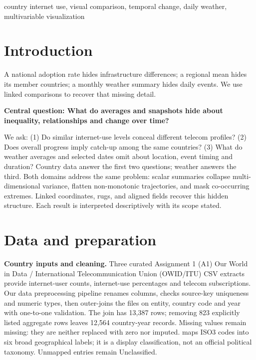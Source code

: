 \documentclass[conference,a4paper]{IEEEtran}
\begin{document}
\begin{IEEEkeywords}country internet use, visual comparison, temporal change, daily weather, multivariable visualization\end{IEEEkeywords}

\section{Introduction}

A national adoption rate hides infrastructure differences; a regional mean hides its member countries; a monthly weather summary hides daily events. We use linked comparisons to recover that missing detail.

\textbf{Central question: What do averages and snapshots hide about inequality, relationships and change over time?}

We ask: (1) Do similar internet-use levels conceal different telecom profiles? (2) Does overall progress imply catch-up among the same countries? (3) What do weather averages and selected dates omit about location, event timing and duration? Country data answer the first two questions; weather answers the third. Both domains address the same problem: scalar summaries collapse multi-dimensional variance, flatten non-monotonic trajectories, and mask co-occurring extremes. Linked coordinates, rugs, and aligned fields recover this hidden structure. Each result is interpreted descriptively with its scope stated.



\section{Data and preparation}

\textbf{Country inputs and cleaning.} Three curated Assignment 1 (A1) Our World in Data / International Telecommunication Union (OWID/ITU) CSV extracts \cite{ref2} provide internet-user counts, internet-use percentages and telecom subscriptions. Our data preprocessing pipeline renames columns, checks source-key uniqueness and numeric types, then outer-joins the files on entity, country code and year with one-to-one validation. The join has 13,387 rows; removing 823 explicitly listed aggregate rows leaves 12,564 country-year records. Missing values remain missing: they are neither replaced with zero nor imputed.  maps ISO3 codes into six broad geographical labels; it is a display classification, not an official political taxonomy. Unmapped entries remain Unclassified.
\end{document}

